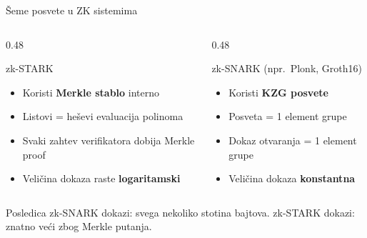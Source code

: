\documentclass[aspectratio=1610]{beamer}
\newcommand{\keyword}[1]{\textcolor{wcprimary}{\textbf{#1}}}
\begin{document}

\begin{frame}{Šeme posvete u ZK sistemima}

\begin{columns}
  \begin{column}{0.48\textwidth}
    \begin{block}{zk-STARK}
      \begin{itemize}
        
        \item Koristi \keyword{Merkle stablo} interno
        \item Listovi = heševi evaluacija polinoma
        \item Svaki zahtev verifikatora dobija Merkle proof
        \item Veličina dokaza raste \keyword{logaritamski}
      \end{itemize}
    \end{block}
  \end{column}
  \begin{column}{0.48\textwidth}
    \begin{exampleblock}{zk-SNARK (npr.\ Plonk, Groth16)}
      \begin{itemize}

        \item Koristi \keyword{KZG posvete}
        \item Posveta = 1 element grupe
        \item Dokaz otvaranja = 1 element grupe
        \item Veličina dokaza \keyword{konstantna}
      \end{itemize}
    \end{exampleblock}
  \end{column}
\end{columns}


\begin{alertblock}{Posledica}
  zk-SNARK dokazi: svega nekoliko stotina bajtova.
  zk-STARK dokazi: znatno veći zbog Merkle putanja.
\end{alertblock}
\end{frame}
\end{document}
